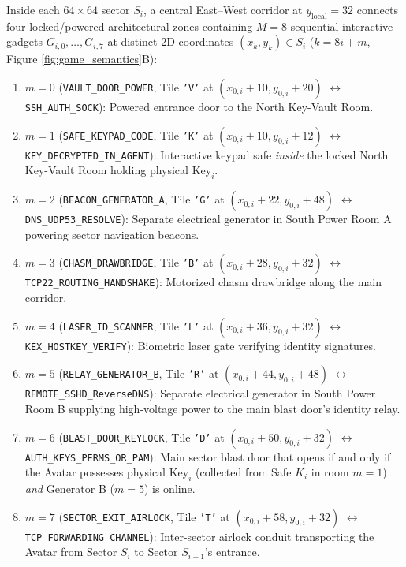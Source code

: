 \documentclass[11pt,a4paper]{article}
\theoremstyle{definition}
\theoremstyle{remark}
\begin{document}
Inside each $64 \times 64$ sector $S_i$, a central East--West corridor at $y_{\text{local}} = 32$ connects four locked/powered architectural zones containing $M = 8$ sequential interactive gadgets $G_{i,0}, \dots, G_{i,7}$ at distinct 2D coordinates $(x_k, y_k) \in S_i$ ($k = 8i + m$, Figure \ref{fig:game_semantics}B):
\begin{enumerate}[noitemsep]
    \item $m=0$ (\texttt{VAULT\_DOOR\_POWER}, Tile \texttt{'V'} at $(x_{0,i}+10, y_{0,i}+20)$ $\leftrightarrow$ \texttt{SSH\_AUTH\_SOCK}): Powered entrance door to the North Key-Vault Room.
    \item $m=1$ (\texttt{SAFE\_KEYPAD\_CODE}, Tile \texttt{'K'} at $(x_{0,i}+10, y_{0,i}+12)$ $\leftrightarrow$ \texttt{KEY\_DECRYPTED\_IN\_AGENT}): Interactive keypad safe \emph{inside} the locked North Key-Vault Room holding physical $\text{Key}_i$.
    \item $m=2$ (\texttt{BEACON\_GENERATOR\_A}, Tile \texttt{'G'} at $(x_{0,i}+22, y_{0,i}+48)$ $\leftrightarrow$ \texttt{DNS\_UDP53\_RESOLVE}): Separate electrical generator in South Power Room A powering sector navigation beacons.
    \item $m=3$ (\texttt{CHASM\_DRAWBRIDGE}, Tile \texttt{'B'} at $(x_{0,i}+28, y_{0,i}+32)$ $\leftrightarrow$ \texttt{TCP22\_ROUTING\_HANDSHAKE}): Motorized chasm drawbridge along the main corridor.
    \item $m=4$ (\texttt{LASER\_ID\_SCANNER}, Tile \texttt{'L'} at $(x_{0,i}+36, y_{0,i}+32)$ $\leftrightarrow$ \texttt{KEX\_HOSTKEY\_VERIFY}): Biometric laser gate verifying identity signatures.
    \item $m=5$ (\texttt{RELAY\_GENERATOR\_B}, Tile \texttt{'R'} at $(x_{0,i}+44, y_{0,i}+48)$ $\leftrightarrow$ \texttt{REMOTE\_SSHD\_ReverseDNS}): Separate electrical generator in South Power Room B supplying high-voltage power to the main blast door's identity relay.
    \item $m=6$ (\texttt{BLAST\_DOOR\_KEYLOCK}, Tile \texttt{'D'} at $(x_{0,i}+50, y_{0,i}+32)$ $\leftrightarrow$ \texttt{AUTH\_KEYS\_PERMS\_OR\_PAM}): Main sector blast door that opens if and only if the Avatar possesses physical $\text{Key}_i$ (collected from Safe $K_i$ in room $m=1$) \emph{and} Generator B ($m=5$) is online.
    \item $m=7$ (\texttt{SECTOR\_EXIT\_AIRLOCK}, Tile \texttt{'T'} at $(x_{0,i}+58, y_{0,i}+32)$ $\leftrightarrow$ \texttt{TCP\_FORWARDING\_CHANNEL}): Inter-sector airlock conduit transporting the Avatar from Sector $S_i$ to Sector $S_{i+1}$'s entrance.
\end{enumerate}
\end{document}
